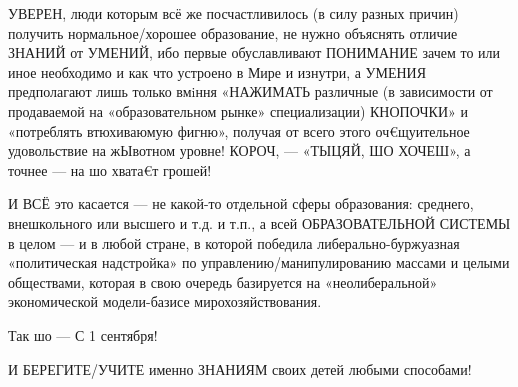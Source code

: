 УВЕРЕН, люди которым всё же посчастливилось (в силу разных причин) получить
нормальное/хорошее образование, не нужно объяснять отличие ЗНАНИЙ от УМЕНИЙ,
ибо первые обуславливают ПОНИМАНИЕ зачем то или иное необходимо и как что
устроено в Мире и изнутри, а УМЕНИЯ предполагают лишь только  вмiння «НАЖИМАТЬ
различные (в зависимости от продаваемой на «образовательном рынке»
специализации) КНОПОЧКИ» и «потреблять втюхиваюмую фигню», получая от всего
этого оч€щуительное удовольствие на жЫвотном уровне! КОРОЧ, — «ТЫЦЯЙ, ШО
ХОЧЕШ», а точнее — на шо хвата€т грошей!

И ВСЁ это касается — не какой-то отдельной сферы образования: среднего,
внешкольного или высшего и т.д. и т.п., а всей ОБРАЗОВАТЕЛЬНОЙ СИСТЕМЫ в целом
— и в любой стране, в которой победила либерально-буржуазная «политическая
надстройка» по управлению/манипулированию массами и целыми обществами, которая
в свою очередь базируется на «неолиберальной» экономической модели-базисе
мирохозяйствования.

Так шо — С 1 сентября!  

И БЕРЕГИТЕ/УЧИТЕ именно ЗНАНИЯМ своих детей любыми способами!
